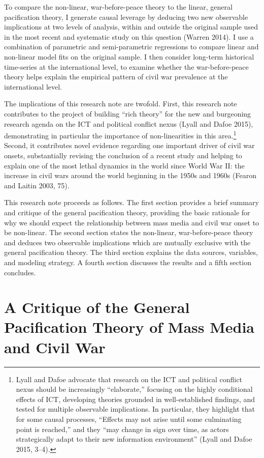 \documentclass[12pt,article,oneside]{memoir}
\begin{document}
To compare the non-linear, war-before-peace theory to the linear,
general pacification theory, I generate causal leverage by deducing two
new observable implications at two levels of analysis, within and
outside the original sample used in the most recent and systematic study
on this question (Warren 2014). I use a combination of parametric and
semi-parametric regressions to compare linear and non-linear model fits
on the original sample. I then consider long-term historical time-series
at the international level, to examine whether the war-before-peace
theory helps explain the empirical pattern of civil war prevalence at
the international level.

The implications of this research note are twofold. First, this research
note contributes to the project of building ``rich theory'' for the new
and burgeoning research agenda on the ICT and political conflict nexus
(Lyall and Dafoe 2015), demonstrating in particular the importance of
non-linearities in this area.\footnote{Lyall and Dafoe advocate that
  research on the ICT and political conflict nexus should be
  increasingly ``elaborate,'' focusing on the highly conditional effects
  of ICT, developing theories grounded in well-established findings, and
  tested for multiple observable implications. In particular, they
  highlight that for some causal processes, ``Effects may not arise
  until some culminating point is reached,'' and they ``may change in
  sign over time, as actors strategically adapt to their new information
  environment'' (Lyall and Dafoe 2015, 3--4).} Second, it contributes
novel evidence regarding one important driver of civil war onsets,
substantially revising the conclusion of a recent study and helping
to explain one of the most lethal dynamics
in the world since World War II: the increase in civil wars around the
world beginning in the 1950s and 1960s (Fearon and Laitin 2003, 75).

This research note proceeds as follows. The first section provides a
brief summary and critique of the general pacification theory, providing
the basic rationale for why we should expect the relationship between
mass media and civil war onset to be non-linear. The second section
states the non-linear, war-before-peace theory and deduces two
observable implications which are mutually exclusive with the general
pacification theory. The third section explains the data sources,
variables, and modeling strategy. A fourth section discusses the results
and a fifth section concludes.

\section{A Critique of the General Pacification Theory of Mass Media and
Civil
War}\label{a-critique-of-the-general-pacification-theory-of-mass-media-and-civil-war}
\end{document}
